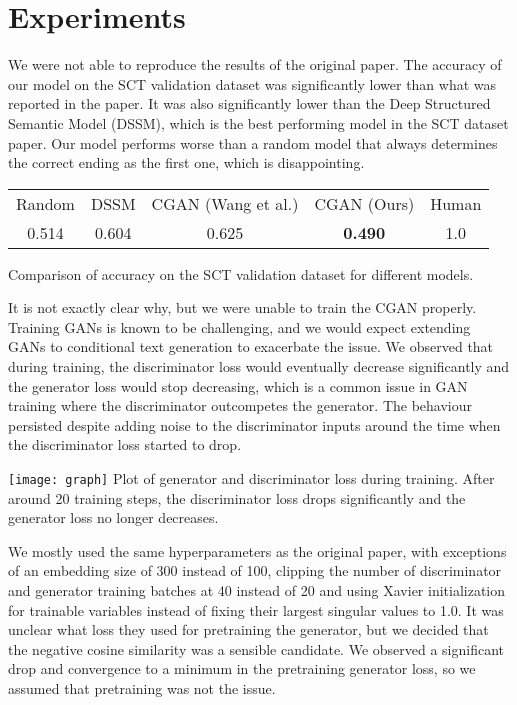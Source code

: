 \documentclass{article}
\begin{document}
\section{Experiments}
We were not able to reproduce the results of the original paper. The accuracy of our model on the SCT validation dataset was significantly lower than what was reported in the paper. It was also significantly lower than the Deep Structured Semantic Model (DSSM), which is the best performing model in the SCT dataset paper. Our model performs worse than a random model that always determines the correct ending as the first one, which is disappointing.
\begin{center}
\begin{tabular}{ | c c c c c |}
\hline
Random & DSSM & CGAN (Wang et al.) & CGAN (Ours) & Human \\ 
 0.514 & 0.604 & 0.625 & \textbf{0.490} & 1.0 \\  
 \hline
\end{tabular} 
\par \bigskip
Comparison of accuracy on the SCT validation dataset for different models.
\end{center}
It is not exactly clear why, but we were unable to train the CGAN properly. Training GANs is known to be challenging, and we would expect extending GANs to conditional text generation to exacerbate the issue. We observed that during training, the discriminator loss would eventually decrease significantly and the generator loss would stop decreasing, which is a common issue in GAN training where the discriminator outcompetes the generator. The behaviour persisted despite adding noise to the discriminator inputs around the time when the discriminator loss started to drop. 
\begin{center}
 \vspace{-4pt}
\texttt{[image: graph]}
Plot of generator and discriminator loss during training. After around 20 training steps, the discriminator loss drops significantly and the generator loss no longer decreases.
\end{center}
We mostly used the same hyperparameters as the original paper, with exceptions of an embedding size of 300 instead of 100, clipping the number of discriminator and generator training batches at 40 instead of 20 and using Xavier initialization for trainable variables instead of fixing their largest singular values to 1.0. It was unclear what loss they used for pretraining the generator, but we decided that the negative cosine similarity was a sensible candidate.  We observed a significant drop and convergence to a minimum in the pretraining generator loss, so we assumed that pretraining was not the issue.
\end{document}
